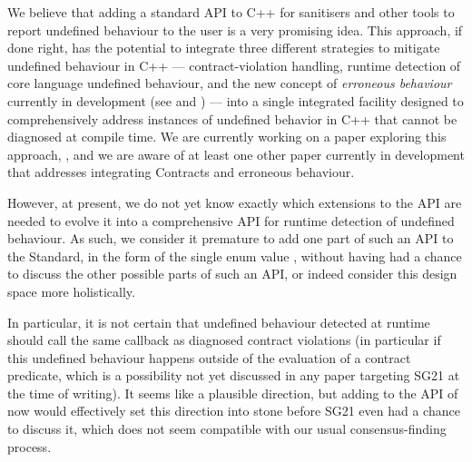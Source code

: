 We believe that adding a standard API to C++ for sanitisers and other tools to report undefined behaviour to the user is a very promising idea. This approach, if done right, has the potential to integrate three different strategies to mitigate undefined behaviour in C++ --- contract-violation handling, runtime detection of core language undefined behaviour, and the new concept of \emph{erroneous behaviour} currently in development (see \cite{P2795R4} and \cite{P2973R0}) --- into a single integrated facility designed to comprehensively address instances of undefined behavior in C++ that cannot be diagnosed at compile time. We are currently working on a paper exploring this approach, \cite{D3100R0}, and we are aware of at least one other paper currently in development that addresses integrating Contracts and erroneous behaviour.

However, at present, we do not yet know exactly which extensions to the \mbox{} \mbox{} API are needed to evolve it into a comprehensive API for runtime detection of undefined behaviour. As such, we consider it premature to add one part of such an API to the Standard, in the form of the single enum value \mbox{}, without having had a chance to discuss the other possible parts of such an API, or indeed consider this design space more holistically.

In particular, it is not certain that undefined behaviour detected at runtime should call the same callback as diagnosed contract violations (in particular if this undefined behaviour happens outside of the evaluation of a contract predicate, which is a possibility not yet discussed in any paper targeting SG21 at the time of writing). It seems like a plausible direction, but adding \mbox{} to the API of \mbox{} now would effectively set this direction into stone before SG21 even had a chance to discuss it, which does not seem compatible with our usual consensus-finding process.

